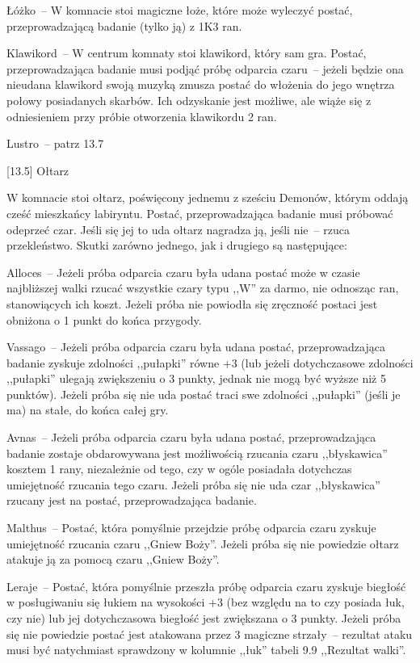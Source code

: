 Łóżko~-- W komnacie stoi magiczne łoże, które może wyleczyć postać, przeprowadzającą badanie (tylko ją) z 1K3 ran.

Klawikord~-- W centrum komnaty stoi klawikord, który sam gra.
Postać, przeprowadzająca badanie musi podjąć próbę odparcia czaru~-- jeżeli będzie ona nieudana klawikord swoją muzyką zmusza postać do włożenia do jego wnętrza połowy posiadanych skarbów.
Ich odzyskanie jest możliwe, ale wiąże się z odniesieniem przy próbie otworzenia klawikordu 2 ran.

Lustro~-- patrz 13.7

[13.5] Ołtarz

W komnacie stoi ołtarz, poświęcony jednemu z sześciu Demonów, którym oddają cześć mieszkańcy labiryntu.
Postać, przeprowadzająca badanie musi próbować odeprzeć czar.
Jeśli się jej to uda ołtarz nagradza ją, jeśli nie~-- rzuca przekleństwo.
Skutki zarówno jednego, jak i drugiego są następujące:

Alloces~-- Jeżeli próba odparcia czaru była udana postać może w czasie najbliższej walki rzucać wszystkie czary typu ,,W'' za darmo, nie odnosząc ran, stanowiących ich koszt.
Jeżeli próba nie powiodła się zręczność postaci jest obniżona o 1 punkt do końca przygody.

Vassago~-- Jeżeli próba odparcia czaru była udana postać, przeprowadzająca badanie zyskuje zdolności ,,pułapki'' równe +3 (lub jeżeli dotychczasowe zdolności ,,pułapki'' ulegają zwiększeniu o 3 punkty, jednak nie mogą być wyższe niż 5 punktów).
Jeżeli próba się nie uda postać traci swe zdolności ,,pułapki'' (jeśli je ma) na stałe, do końca całej gry.

Avnas~-- Jeżeli próba odparcia czaru była udana postać, przeprowadzająca badanie zostaje obdarowywana jest możliwością rzucania czaru ,,błyskawica'' kosztem 1 rany, niezależnie od tego, czy w ogóle posiadała dotychczas umiejętność rzucania tego czaru.
Jeżeli próba się nie uda czar ,,błyskawica'' rzucany jest na postać, przeprowadzająca badanie.

Malthus~-- Postać, która pomyślnie przejdzie próbę odparcia czaru zyskuje umiejętność rzucania czaru ,,Gniew Boży''.
Jeżeli próba się nie powiedzie ołtarz atakuje ją za pomocą czaru ,,Gniew Boży''.

Leraje~-- Postać, która pomyślnie przeszła próbę odparcia czaru zyskuje biegłość w posługiwaniu się łukiem na wysokości +3 (bez względu na to czy posiada łuk, czy nie) lub jej dotychczasowa biegłość jest zwiększana o 3 punkty.
Jeżeli próba się nie powiedzie postać jest atakowana przez 3 magiczne strzały~-- rezultat ataku musi być natychmiast sprawdzony w kolumnie ,,łuk'' tabeli 9.9 ,,Rezultat walki''.

